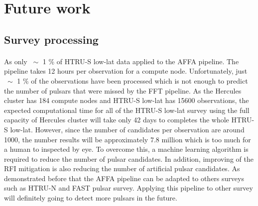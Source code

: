 \documentclass[../chapter1/thesis_msc.tex]{subfiles}
\begin{document}
\section{Future work}
\subsection{Survey processing}
\paragraph{} As only $~\sim$ 1 \% of HTRU-S low-lat data applied to the AFFA pipeline. The pipeline takes 12 hours per observation for a compute node. Unfortunately, just $~\sim$ 1 \% of the observations have been processed which is not enough to predict the number of pulsars that were missed by the FFT pipeline. As the Hercules cluster has 184 compute nodes and HTRU-S low-lat has 15600 observations, the expected computational time for all of the HTRU-S low-lat survey using the full capacity of Hercules cluster will take only 42 days to completes the whole HTRU-S low-lat. However, since the number of candidates per observation are around 1000, the number results will be approximately 7.8 million which is too much for a human to inspected by eye. To overcome this, a machine learning algorithm is required to reduce the number of pulsar candidates. In addition, improving of the RFI mitigation is also reducing the number of artificial pulsar candidates.  As demonstrated before that the AFFA pipeline can be adapted to others surveys such as HTRU-N and FAST pulsar survey. Applying this pipeline to other survey will definitely going to detect more pulsars in the future. %
\end{document}

